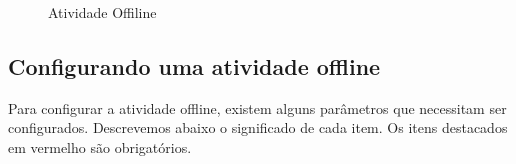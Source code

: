 \begin{figure}[!htbp]
 \begin{center}
\caption{Atividade Offiline}
  \label{fig:cap5_39}
 \end{center}
\end{figure}
\subsection{Configurando uma atividade offline}

Para configurar a atividade offline, existem alguns parâmetros que necessitam ser configurados. Descrevemos abaixo o significado de cada item. Os itens destacados em vermelho são obrigatórios.

